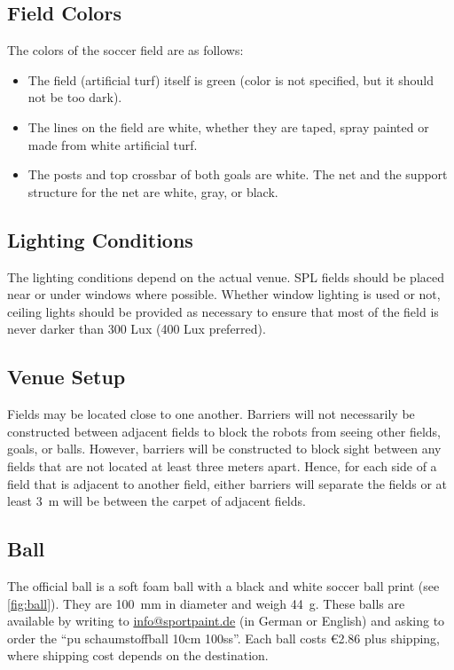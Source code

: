 \subsection{Field Colors}
\label{sec:field_colors}

The colors of the soccer field are as follows:
\begin{itemize}
  \item The field (artificial turf) itself is green (color is not specified, but it should not be too dark).
  \item The lines on the field are white, whether they are taped, spray painted or made from white artificial turf.
  \item The posts and top crossbar of both goals are white.
    The net and the support structure for the net are white, gray, or black.
\end{itemize}

\subsection{Lighting Conditions}
\label{sec:lightConditions}

The lighting conditions depend on the actual venue.
SPL fields should be placed near or under windows where possible.
Whether window lighting is used or not, ceiling lights should be provided as necessary to ensure that most of the field is never darker than 300 Lux (400 Lux preferred).

\subsection{Venue Setup}
\label{sec:boundaries}

Fields may be located close to one another.
Barriers will not necessarily be constructed between adjacent fields to block the robots from seeing other fields, goals, or balls.
However, barriers will be constructed to block sight between any fields that are not located at least three meters apart.
Hence, for each side of a field that is adjacent to another field, either barriers will separate the fields or at least \qty{3}{\metre} will be between the carpet of adjacent fields.

\subsection{Ball}
\label{sec:ball}

The official ball is a soft foam ball with a black and white soccer ball print (see \cref{fig:ball}).
They are \qty{100}{\milli\metre} in diameter and weigh \qty{44}{\gram}.
These balls are available by writing to \url{info@sportpaint.de} (in German or English) and asking to order the ``pu schaumstoffball 10cm 100ss''.
Each ball costs \euro{2.86} plus shipping, where shipping cost depends on the destination.

